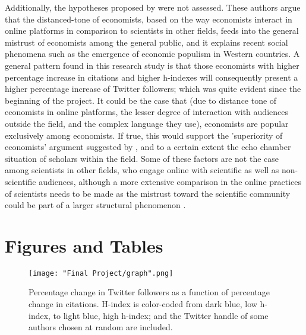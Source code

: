 \documentclass[12pt,english]{article}
\begin{document}
Additionally, the hypotheses proposed by \cite{giusta.2018} were not assessed. These authors argue that the distanced-tone of economists, based on the way economists interact in online platforms in comparison to scientists in other fields, feeds into the general mistrust of economists among the general public, and it explains recent social phenomena such as the emergence of economic populism in Western countries. A general pattern found in this research study is that those economists with higher percentage increase in citations and higher h-indexes will consequently present a higher percentage increase of Twitter followers; which was quite evident since the beginning of the project. It could be the case that (due to distance tone of economists in online platforms, the lesser degree of interaction with audiences outside the field, and the complex language they use), economists are popular exclusively among economists. If true, this would support the 'superiority of economists' argument suggested by \citep{superiority}, and to a certain extent the echo chamber situation of scholars within the field. Some of these factors are not the case among scientists in other fields, who engage online with scientific as well as non-scientific audiences, although a more extensive comparison in the online practices of scientists needs to be made as the mistrust toward the scientific community could be part of a larger structural phenomenon \citep{new.yorker}. 

\vfill
\pagebreak{}
\begin{spacing}{1.0}


\end{spacing}

\vfill
\pagebreak{}
\clearpage

\section*{Figures and Tables}\label{sec:figTables}

\begin{figure}[ht]
\centering
\bigskip{}
\texttt{[image: "Final Project/graph".png]}
\caption{Percentage change in Twitter followers as a function of percentage change in citations. H-index is color-coded from dark blue, low h-index, to light blue, high h-index; and the Twitter handle of some authors chosen at random are included.}
\label{fig:fig1}
\end{figure}
\end{document}
